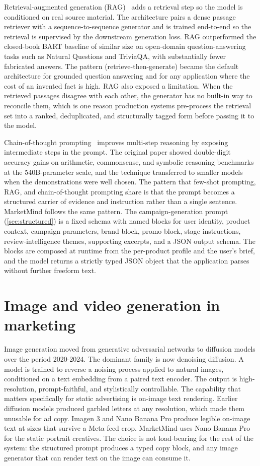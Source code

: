 \documentclass[12pt,a4paper]{report}
\begin{document}
Retrieval-augmented generation (RAG)~\cite{lewis2020rag} adds a retrieval step so the model is conditioned on real source material. The architecture pairs a dense passage retriever with a sequence-to-sequence generator and is trained end-to-end so the retrieval is supervised by the downstream generation loss. RAG outperformed the closed-book BART baseline of similar size on open-domain question-answering tasks such as Natural Questions and TriviaQA, with substantially fewer fabricated answers. The pattern (retrieve-then-generate) became the default architecture for grounded question answering and for any application where the cost of an invented fact is high. RAG also exposed a limitation. When the retrieved passages disagree with each other, the generator has no built-in way to reconcile them, which is one reason production systems pre-process the retrieval set into a ranked, deduplicated, and structurally tagged form before passing it to the model.

Chain-of-thought prompting~\cite{wei2022cot} improves multi-step reasoning by exposing intermediate steps in the prompt. The original paper showed double-digit accuracy gains on arithmetic, commonsense, and symbolic reasoning benchmarks at the 540B-parameter scale, and the technique transferred to smaller models when the demonstrations were well chosen. The pattern that few-shot prompting, RAG, and chain-of-thought prompting share is that the prompt becomes a structured carrier of evidence and instruction rather than a single sentence. MarketMind follows the same pattern. The campaign-generation prompt (\cref{sec:structured}) is a fixed schema with named blocks for user identity, product context, campaign parameters, brand block, promo block, stage instructions, review-intelligence themes, supporting excerpts, and a JSON output schema. The blocks are composed at runtime from the per-product profile and the user's brief, and the model returns a strictly typed JSON object that the application parses without further freeform text.

\section{Image and video generation in marketing}
\label{sec:imagevideo}

Image generation moved from generative adversarial networks to diffusion models over the period 2020-2024. The dominant family is now denoising diffusion. A model is trained to reverse a noising process applied to natural images, conditioned on a text embedding from a paired text encoder. The output is high-resolution, prompt-faithful, and stylistically controllable. The capability that matters specifically for static advertising is on-image text rendering. Earlier diffusion models produced garbled letters at any resolution, which made them unusable for ad copy. Imagen 3 and Nano Banana Pro produce legible on-image text at sizes that survive a Meta feed crop. MarketMind uses Nano Banana Pro for the static portrait creatives. The choice is not load-bearing for the rest of the system: the structured prompt produces a typed copy block, and any image generator that can render text on the image can consume it.
\end{document}
